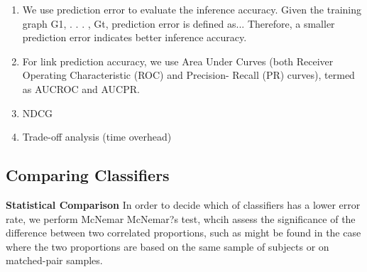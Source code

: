 \begin{enumerate}
    \item We use prediction error to evaluate the inference accuracy. Given the training graph G1, . . . , Gt, prediction error is defined as... Therefore, a smaller prediction error indicates better inference accuracy.
    
    \item For link prediction accuracy, we use Area Under Curves
(both Receiver Operating Characteristic (ROC) and Precision-
Recall (PR) curves), termed as AUCROC and AUCPR.

    \item NDCG
    
    \item Trade-off analysis (time overhead)
    
\end{enumerate}


\subsection{Comparing Classifiers}


\textbf{Statistical Comparison} In order to decide which of classifiers has a lower error rate, we perform McNemar McNemar?s test, whcih  assess the significance of the difference between two correlated proportions, such as might be found in the case where the two proportions are based on the same sample of subjects or on matched-pair samples.



